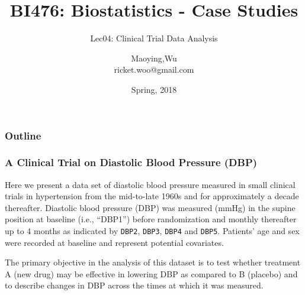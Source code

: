 \documentclass[table,10pt]{beamer}\usepackage[]{graphicx}\usepackage[]{color}
\title[BI476]{BI476: Biostatistics - Case Studies}
\subtitle[anova]{Lec04: Clinical Trial Data Analysis}
\author[Maoying Wu]{Maoying,Wu\\{\small ricket.woo@gmail.com}}
\institute[CBB] %
{
  \inst{}
  Dept. of Bioinformatics \& Biostatistics\\
  Shanghai Jiao Tong University
}
\date{Spring, 2018}
\makeatletter
\newcommand{\hlstr}[1]{\textcolor[rgb]{0.192,0.494,0.8}{#1}}%
\newcommand{\hlopt}[1]{\textcolor[rgb]{0,0,0}{#1}}%
\newcommand{\hlstd}[1]{\textcolor[rgb]{0.345,0.345,0.345}{#1}}%
\newcommand{\hlkwb}[1]{\textcolor[rgb]{0.69,0.353,0.396}{#1}}%
\newcommand{\hlkwc}[1]{\textcolor[rgb]{0.333,0.667,0.333}{#1}}%
\newcommand{\hlkwd}[1]{\textcolor[rgb]{0.737,0.353,0.396}{\textbf{#1}}}%
\newenvironment{kframe}{%
 \def\at@end@of@kframe{}%
 \ifinner\ifhmode%
  \def\at@end@of@kframe{\end{minipage}}%
  \begin{minipage}{\columnwidth}%
 \fi\fi%
 \def\FrameCommand##1{\hskip\@totalleftmargin \hskip-\fboxsep
 \colorbox{shadecolor}{##1}\hskip-\fboxsep
     \hskip-\linewidth \hskip-\@totalleftmargin \hskip\columnwidth}%
 \MakeFramed {\advance\hsize-\width
   \@totalleftmargin\z@ \linewidth\hsize
   \@setminipage}}%
 {\par\unskip\endMakeFramed%
 \at@end@of@kframe}
\newenvironment{knitrout}{}{} %
\makeatother
\begin{document}
\begin{CJK*}{UTF8}{gbsn}



\begin{frame}
  \titlepage
\end{frame}

\begin{frame}
\frametitle{Outline}
	\tableofcontents
\end{frame}

\begin{frame}[t,containsverbatim]
\frametitle{A Clinical Trial on Diastolic Blood Pressure (DBP)}
Here we present a data set of diastolic blood pressure measured in 
small clinical trials in hypertension from the mid-to-late 1960s and 
for approximately a decade thereafter. Diastolic blood pressure (DBP) 
was measured (mmHg) in the supine position at baseline (i.e., ``DBP1'') 
before randomization and monthly thereafter up to 4 months as indicated 
by \texttt{DBP2}, \texttt{DBP3}, \texttt{DBP4} and \texttt{DBP5}. 
Patients' age and sex were recorded at baseline and represent potential 
covariates.

The primary objective in the analysis of this dataset is to test 
whether treatment A (new drug) may be effective in lowering DBP as 
compared to B (placebo) and to describe changes in DBP across the times 
at which it was measured.
\end{frame}





\end{CJK*}
\end{document}
